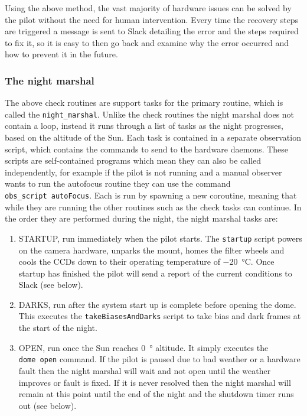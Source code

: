 \begin{colsection}
\begin{colsection}
Using the above method, the vast majority of hardware issues can be solved by the pilot without the need for human intervention. Every time the recovery steps are triggered a message is sent to Slack detailing the error and the steps required to fix it, so it is easy to then go back and examine why the error occurred and how to prevent it in the future.

\subsubsection{The night marshal}

The above check routines are support tasks for the primary routine, which is called the \texttt{night\_marshal}. Unlike the check routines the night marshal does not contain a loop, instead it runs through a list of tasks as the night progresses, based on the altitude of the Sun. Each task is contained in a separate  observation script, which contains the commands to send to the hardware daemons. These scripts are self-contained programs which mean they can also be called independently, for example if the pilot is not running and a manual observer wants to run the autofocus routine they can use the command \texttt{obs\_script~autoFocus}. Each is run by spawning a new coroutine, meaning that while they are running the other routines such as the check tasks can continue. In the order they are performed during the night, the night marshal tasks are:

\begin{enumerate}

\item STARTUP, run immediately when the pilot starts. The \texttt{startup} script powers on the camera hardware, unparks the mount, homes the filter wheels and cools the CCDs down to their operating temperature of \SI{-20}{\celsius}. Once startup has finished the pilot will send a report of the current conditions to Slack (see  below).

\item DARKS, run after the system start up is complete before opening the dome. This executes the \texttt{takeBiasesAndDarks} script to take bias and dark frames at the start of the night. 

\item OPEN, run once the Sun reaches \SI{0}{\degree} altitude. It simply executes the \texttt{dome~open} command. If the pilot is paused due to bad weather or a hardware fault then the night marshal will wait and not open until the weather improves or fault is fixed. If it is never resolved then the night marshal will remain at this point until the end of the night and the shutdown timer runs out (see below).


\end{enumerate}
\end{colsection}
\end{colsection}

